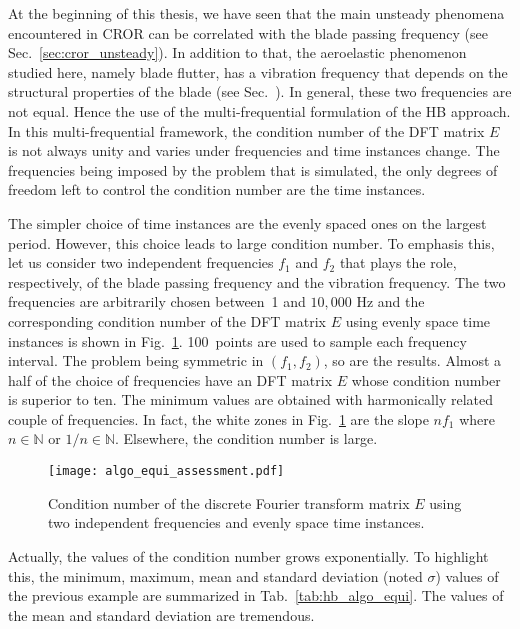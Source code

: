 
At the beginning of this thesis, we have seen that the main unsteady
phenomena encountered in CROR can be correlated with the blade passing
frequency (see Sec.~\ref{sec:cror_unsteady}).
In addition to that, the aeroelastic phenomenon
studied here, namely blade flutter, has a vibration frequency that
depends on the structural properties of the blade (see Sec.~). 
In general, these two
frequencies are not equal. Hence the use of the
multi-frequential formulation of the HB approach. 
In this multi-frequential framework,
the condition number of the DFT matrix $E$ is not always unity and
varies under frequencies and time instances change. The frequencies
being imposed by the problem that is simulated,
the only degrees of freedom left to control the condition
number are the time instances. 

The simpler choice of time instances are the evenly spaced ones on
the largest period. However, this choice leads to large condition number.
To emphasis this, let us consider two independent frequencies $f_1$
and $f_2$ that plays the role, respectively, of the blade passing frequency and
the vibration frequency. The two frequencies are arbitrarily chosen between~1
and $10,000$ Hz and the corresponding
condition number of the DFT matrix $E$
using evenly space time instances is shown in Fig.~\ref{fig:algo_equi_assessment}.
100~points are used to sample each frequency interval.
The problem being symmetric in $(f_1, f_2)$, so are the results.
Almost a half of the choice of frequencies have an DFT matrix $E$
whose condition number is superior to ten.
The minimum values are obtained with harmonically related couple
of frequencies. In fact, the white zones in Fig.~\ref{fig:algo_equi_assessment}
are the slope $n f_1$ where $n \in \mathbb{N}$ or $1/n \in \mathbb{N}$.
Elsewhere, the condition number is large. 
\begin{figure}[htb]
  \centering
  \texttt{[image: algo\_equi\_assessment.pdf]}
  \caption{Condition number of the discrete Fourier transform matrix $E$
  using two independent frequencies and evenly space time instances.}
  \label{fig:algo_equi_assessment}
\end{figure}

Actually, the values of the condition number grows exponentially. To highlight
this, the minimum, maximum, mean and standard deviation (noted $\sigma$) values of the
previous example are summarized in Tab.~\ref{tab:hb_algo_equi}. 
The values of the mean and standard deviation are tremendous.

